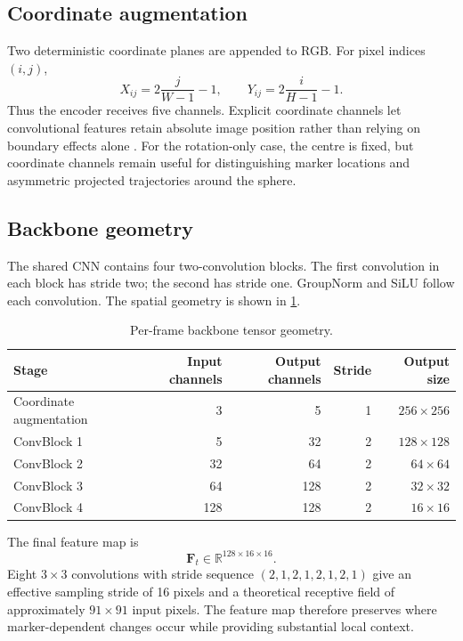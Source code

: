 \documentclass[11pt,a4paper]{article}
\newcommand{\R}{\mathbb R}
\newcommand{\vect}[1]{\mathbf{#1}}
\begin{document}
\subsection{Coordinate augmentation}
Two deterministic coordinate planes are appended to RGB. For pixel indices $(i,j)$,
\begin{equation}
X_{ij}=2\frac{j}{W-1}-1,\qquad Y_{ij}=2\frac{i}{H-1}-1.
\end{equation}
Thus the encoder receives five channels. Explicit coordinate channels let convolutional features retain absolute image position rather than relying on boundary effects alone \citep{liu2018coordconv}. For the rotation-only case, the centre is fixed, but coordinate channels remain useful for distinguishing marker locations and asymmetric projected trajectories around the sphere.

\subsection{Backbone geometry}
The shared CNN contains four two-convolution blocks. The first convolution in each block has stride two; the second has stride one. GroupNorm and SiLU follow each convolution. The spatial geometry is shown in \cref{tab:backbone}.

\begin{table}[H]
\centering
\caption{Per-frame backbone tensor geometry.}
\label{tab:backbone}
\begin{tabular}{lrrrr}
\toprule
Stage & Input channels & Output channels & Stride & Output size\\
\midrule
Coordinate augmentation & 3 & 5 & 1 & $256\times256$\\
ConvBlock 1 & 5 & 32 & 2 & $128\times128$\\
ConvBlock 2 & 32 & 64 & 2 & $64\times64$\\
ConvBlock 3 & 64 & 128 & 2 & $32\times32$\\
ConvBlock 4 & 128 & 128 & 2 & $16\times16$\\
\bottomrule
\end{tabular}
\end{table}

The final feature map is
\begin{equation}
\vect F_t\in\R^{128\times16\times16}.
\end{equation}
Eight $3\times3$ convolutions with stride sequence $(2,1,2,1,2,1,2,1)$ give an effective sampling stride of 16 pixels and a theoretical receptive field of approximately $91\times91$ input pixels. The feature map therefore preserves where marker-dependent changes occur while providing substantial local context.
\end{document}
